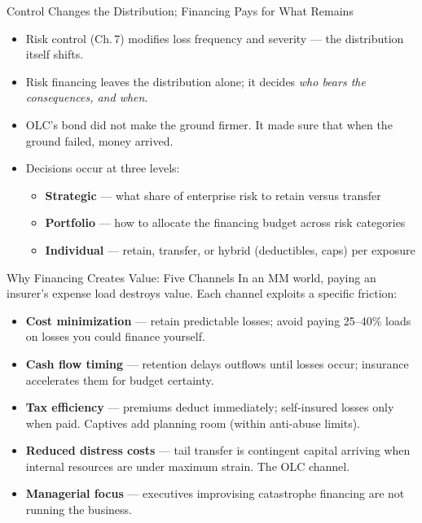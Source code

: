 \documentclass[11pt, aspectratio=169]{beamer}
\begin{document}
\begin{frame}{Control Changes the Distribution; Financing Pays for What Remains}
\begin{itemize}
  \item \alert{Risk control} (Ch.\,7) modifies loss frequency and severity --- the distribution itself shifts.
  \item \alert{Risk financing} leaves the distribution alone; it decides \emph{who bears the consequences, and when}.
  \item OLC's bond did not make the ground firmer. It made sure that when the ground failed, money arrived.
  \item Decisions occur at three levels:
  \begin{itemize}
    \item \textbf{Strategic} --- what share of enterprise risk to retain versus transfer
    \item \textbf{Portfolio} --- how to allocate the financing budget across risk categories
    \item \textbf{Individual} --- retain, transfer, or hybrid (deductibles, caps) per exposure
  \end{itemize}
\end{itemize}
\end{frame}

\begin{frame}{Why Financing Creates Value: Five Channels}
In an MM world, paying an insurer's expense load destroys value. Each channel exploits a specific friction:
\begin{itemize}
  \item \textbf{Cost minimization} --- retain predictable losses; avoid paying 25--40\% loads on losses you could finance yourself.
  \item \textbf{Cash flow timing} --- retention delays outflows until losses occur; insurance accelerates them for budget certainty.
  \item \textbf{Tax efficiency} --- premiums deduct immediately; self-insured losses only when paid. Captives add planning room (within anti-abuse limits).
  \item \textbf{Reduced distress costs} --- tail transfer is contingent capital arriving when internal resources are under maximum strain. The OLC channel.
  \item \textbf{Managerial focus} --- executives improvising catastrophe financing are not running the business.
\end{itemize}
\end{frame}
\end{document}
